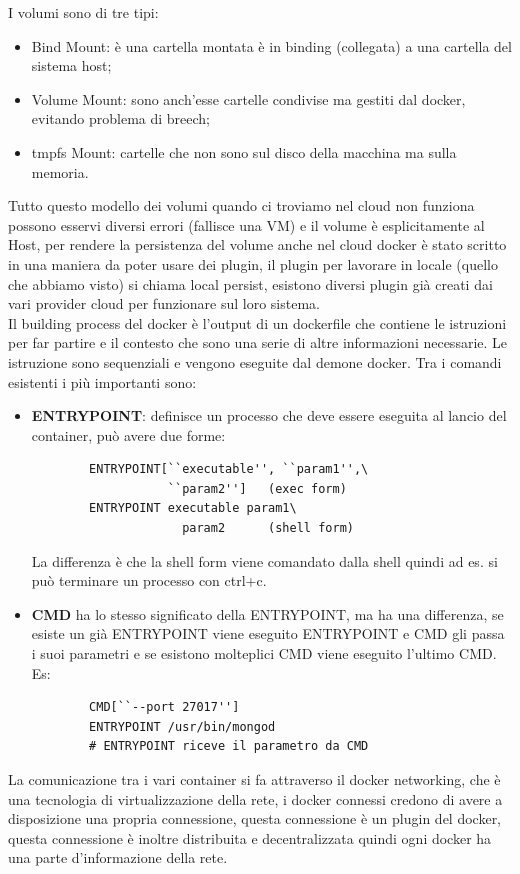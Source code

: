 \documentclass[11pt, twocolumn]{article}
\newenvironment{myitemize}
{ \begin{itemize}[topsep=0ex]
		\setlength{\itemsep}{0pt}
		\setlength{\parskip}{0pt}
		\setlength{\parsep}{0pt}     }
	{ \end{itemize}                  }
\begin{document}
I volumi sono di tre tipi:
\begin{myitemize}
	\item Bind Mount: è una cartella montata è in binding (collegata) a una cartella del sistema host;
	\item Volume Mount: sono anch'esse cartelle condivise ma gestiti dal docker, evitando problema di breech;
	\item tmpfs Mount: cartelle che non sono sul disco della macchina ma sulla memoria.
\end{myitemize}
Tutto questo modello dei volumi quando ci troviamo nel cloud non funziona possono esservi diversi errori (fallisce una VM) e il volume è esplicitamente al Host, per rendere la persistenza del volume anche nel cloud docker è stato scritto in una maniera da poter usare dei plugin, il plugin per lavorare in locale (quello che abbiamo visto) si chiama local persist, esistono diversi plugin già creati dai vari provider cloud per funzionare sul loro sistema.\\
Il building process del docker è l'output di un dockerfile che contiene le istruzioni per far partire e il contesto che sono una serie di altre informazioni necessarie.
Le istruzione sono sequenziali e vengono eseguite dal demone docker. Tra i comandi esistenti i più importanti sono:
\begin{itemize}[wide, noitemsep, topsep=0ex]
	\item \textbf{ENTRYPOINT}: definisce un processo che deve essere eseguita al lancio del container, può avere due forme:
	\begin{verbatim}
		ENTRYPOINT[``executable'', ``param1'',\ 
		           ``param2'']   (exec form)
		ENTRYPOINT executable param1\
		             param2      (shell form)
	\end{verbatim}
	La differenza è che la shell form viene comandato dalla shell quindi ad es. si può terminare un processo con ctrl+c.
	\item \textbf{CMD} ha lo stesso significato della ENTRYPOINT, ma ha una differenza, se esiste un già ENTRYPOINT viene eseguito ENTRYPOINT e CMD gli passa i suoi parametri e se esistono molteplici CMD viene eseguito l'ultimo CMD. Es:
	\begin{verbatim}
		CMD[``--port 27017'']
		ENTRYPOINT /usr/bin/mongod
		# ENTRYPOINT riceve il parametro da CMD
	\end{verbatim}
\end{itemize}
La comunicazione tra i vari container si fa attraverso il docker networking, che è una tecnologia di virtualizzazione della rete, i docker connessi credono di avere a disposizione una propria connessione, questa connessione è un plugin del docker, questa connessione è inoltre distribuita e decentralizzata quindi ogni docker ha una parte d'informazione della rete.
\end{document}
